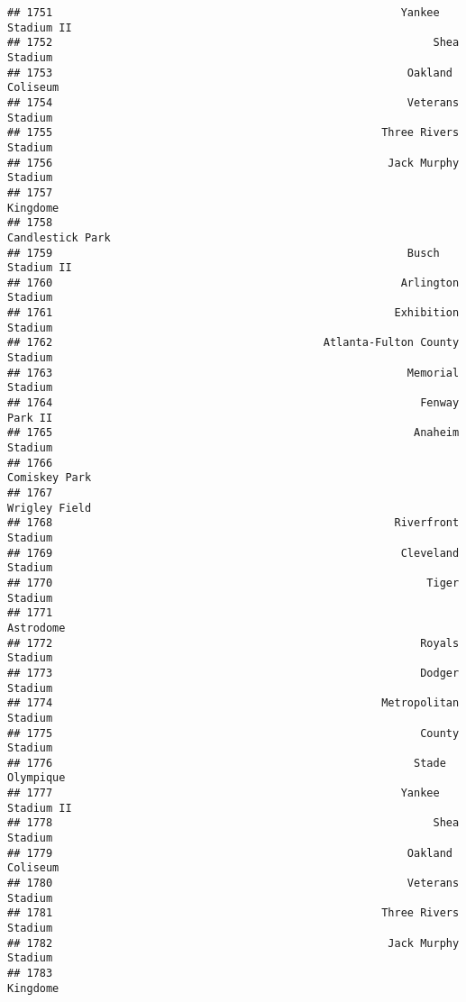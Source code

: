 \documentclass[]{article}
\begin{document}
\begin{verbatim}
## 1751                                                      Yankee Stadium II
## 1752                                                           Shea Stadium
## 1753                                                       Oakland Coliseum
## 1754                                                       Veterans Stadium
## 1755                                                   Three Rivers Stadium
## 1756                                                    Jack Murphy Stadium
## 1757                                                               Kingdome
## 1758                                                       Candlestick Park
## 1759                                                       Busch Stadium II
## 1760                                                      Arlington Stadium
## 1761                                                     Exhibition Stadium
## 1762                                          Atlanta-Fulton County Stadium
## 1763                                                       Memorial Stadium
## 1764                                                         Fenway Park II
## 1765                                                        Anaheim Stadium
## 1766                                                          Comiskey Park
## 1767                                                          Wrigley Field
## 1768                                                     Riverfront Stadium
## 1769                                                      Cleveland Stadium
## 1770                                                          Tiger Stadium
## 1771                                                              Astrodome
## 1772                                                         Royals Stadium
## 1773                                                         Dodger Stadium
## 1774                                                   Metropolitan Stadium
## 1775                                                         County Stadium
## 1776                                                        Stade Olympique
## 1777                                                      Yankee Stadium II
## 1778                                                           Shea Stadium
## 1779                                                       Oakland Coliseum
## 1780                                                       Veterans Stadium
## 1781                                                   Three Rivers Stadium
## 1782                                                    Jack Murphy Stadium
## 1783                                                               Kingdome

\end{verbatim}
\end{document}
